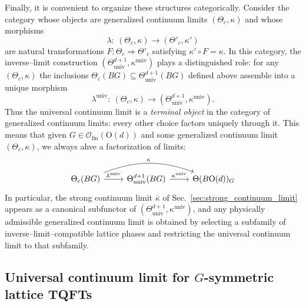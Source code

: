 \documentclass[aps,prx,reprint,superscriptaddress,twocolumn,amsmath,amssymb,amsfonts, nofootinbib]{revtex4-2}
\newcommand{\ofin}{\mathcal{O}_{\text{fin}}}
\theoremstyle{apsstyle}
\begin{document}
Finally, it is convenient to organize these structures categorically. Consider the
category whose objects are generalized continuum limits
$(\Theta_{c},\kappa)$ and whose morphisms
\begin{equation*}
    \lambda:\ (\Theta_{c},\kappa)\longrightarrow(\Theta'_{c},\kappa')
\end{equation*}
are natural transformations $F:\Theta_{c}\Rightarrow\Theta'_{c}$ satisfying
$\kappa' \circ F = \kappa$. In this category, the inverse–limit construction
$(\Theta^{d+1}_{\mathrm{univ}},\kappa^{\mathrm{univ}})$ plays a distinguished role:
for any $(\Theta_{c},\kappa)$ the inclusions
$\Theta_{c}(BG)\subseteq\Theta^{d+1}_{\mathrm{univ}}(BG)$ defined above assemble
into a unique morphism
\begin{equation*}
    \lambda^{\mathrm{univ}}:\ (\Theta_{c},\kappa)\longrightarrow
    (\Theta^{d+1}_{\mathrm{univ}},\kappa^{\mathrm{univ}}).
\end{equation*}
Thus the universal continuum limit is a \emph{terminal
object} in the category of generalized continuum limits: every other choice
factors uniquely through it. This means that given $G\in \ofin(\mathrm{O}(d))$ and some generalized continuum limit $(\Theta_{c},\kappa)$, we always ahve a factorization of limits:
\begin{equation*}
    \begin{tikzcd}
        \Theta_{c}(BG) \arrow[rr, bend left = 20, "\kappa"] \arrow[r, "\lambda^{\mathrm{univ}}"] &\Theta^{d+1}_{\mathrm{univ}}(BG) \arrow[r, "\kappa^{\mathrm{univ}}"] &\Theta(B\mathrm{O}(d))_{G}
    \end{tikzcd}
\end{equation*}
In particular, the strong continuum limit $\overline{\kappa}$ of Sec.~\ref{sec:strong_continuum_limit} appears as a canonical subfunctor of $(\Theta^{d+1}_{\mathrm{univ}},\kappa^{\mathrm{univ}})$, and any physically admissible generalized continuum limit is obtained by selecting a subfamily of inverse–limit–compatible lattice phases and restricting the universal continuum limit to that subfamily.



\subsection{Universal continuum limit for $G$-symmetric lattice TQFTs}
\label{app:continuum_limit_component}
\end{document}
